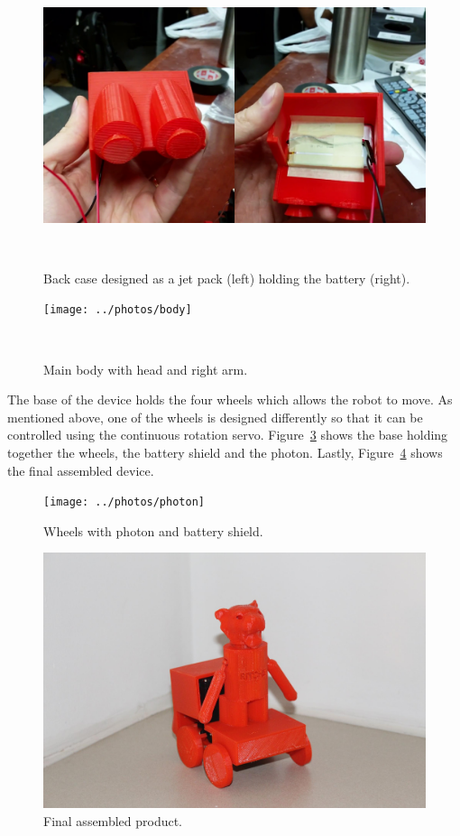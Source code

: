 \documentclass{sigchi-ext}
\begin{document}
\begin{figure}
  \includegraphics[width=0.9\columnwidth]{../photos/jetpack}
  \caption{Back case designed as a jet pack (left) holding the battery (right).}~\label{fig:jetpack}
\end{figure}

\begin{figure}
  \centering
  \texttt{[image: ../photos/body]}
  \caption{Main body with head and right arm.}~\label{fig:body}
\end{figure}

The base of the device holds the four wheels which allows the robot to move. As
mentioned above, one of the wheels is designed differently so that it can be
controlled using the continuous rotation servo. Figure~\ref{fig:photon} shows
the base holding together the wheels, the battery shield and the photon.
Lastly, Figure~\ref{fig:final} shows the final assembled device.

\begin{figure}
  \texttt{[image: ../photos/photon]}
  \caption{Wheels with photon and battery shield.}
  \label{fig:photon}
\end{figure}

\begin{figure}
  \includegraphics[width=0.9\columnwidth]{../photos/final}
  \caption{Final assembled product.}
  \label{fig:final}
\end{figure}
\end{document}
